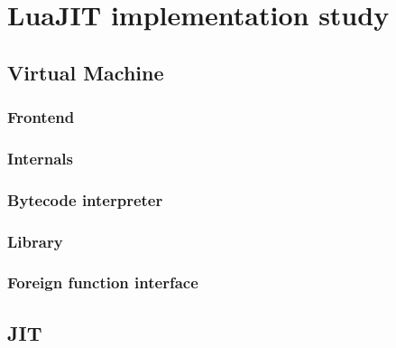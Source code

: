 \documentclass[12pt, oneside]{Thesis}
\begin{document}

\part{LuaJIT implementation study}
\label{Part:luajit-doc}

  \chapter{Virtual Machine}
  \label{Chapt:VM}

    \section{Frontend}
    \label{Sec:frontend}
    

    \section{Internals}
    \label{Sec:Internals}
    

    \section{Bytecode interpreter}
    \label{Sec:BI}
    

    \section{Library}
    \label{Sec:Library}
    

    \section{Foreign function interface}
    \label{Sec:FFI}
    

  \chapter{JIT}
  \label{Chapt:JIT}
\end{document}
